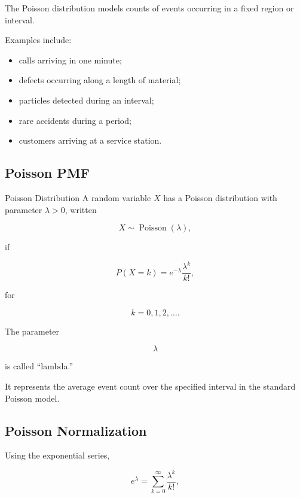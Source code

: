 The Poisson distribution models counts of events occurring in a fixed
region or interval.

Examples include:

\begin{itemize}
    \item calls arriving in one minute;
    \item defects occurring along a length of material;
    \item particles detected during an interval;
    \item rare accidents during a period;
    \item customers arriving at a service station.
\end{itemize}

\subsection{Poisson PMF}
\label{subsec:poisson-pmf}

\begin{definitionbox}{Poisson Distribution}
A random variable \(X\) has a Poisson distribution with parameter
\(\lambda>0\), written

\[
\boxed{
X\sim\operatorname{Poisson}(\lambda),
}
\]

if

\[
\boxed{
P(X=k)
=
e^{-\lambda}
\frac{\lambda^k}{k!},
}
\]

for

\[
k=0,1,2,\ldots.
\]
\end{definitionbox}

The parameter

\[
\lambda
\]

is called ``lambda.''

It represents the average event count over the specified interval in
the standard Poisson model.

\subsection{Poisson Normalization}
\label{subsec:poisson-normalization}

Using the exponential series,

\[
e^\lambda
=
\sum_{k=0}^{\infty}
\frac{\lambda^k}{k!},
\]


